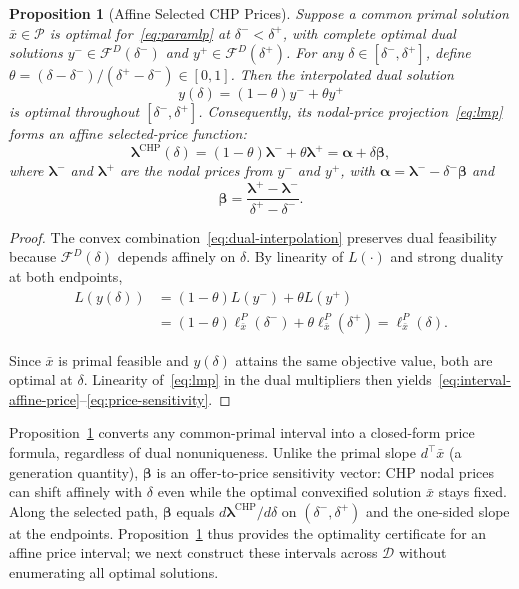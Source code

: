 \documentclass[journal]{IEEEtran}
\newtheorem{proposition}{Proposition}
\newcommand{\blambda}{\bm\lambda}
\newcommand{\CHP}{\mathrm{CHP}}
\begin{document}
\begin{proposition}[Affine Selected CHP Prices]
\label{prop:dual}
Suppose a common primal solution $\bar{x}\!\!\in\!\!\mathcal{P}$ is optimal for~\eqref{eq:paramlp} at $\delta^-\!\!<\!\!\delta^+$, with complete optimal dual solutions $y^-\!\!\in\!\!\mathcal{F}^D(\delta^-)$ and $y^+\!\!\in\!\!\mathcal{F}^D(\delta^+)$. For any $\delta\!\in\![\delta^-,\delta^+]$, define $\theta\!\!=\!\!(\delta\!-\!\delta^-)\!/\!(\delta^+\!-\!\delta^-)\!\in\![0,1]$. Then the interpolated dual solution
\begin{equation}
y(\delta) = (1-\theta)y^- + \theta y^+\label{eq:dual-interpolation}
\end{equation}
is optimal throughout $[\delta^-,\delta^+]$. Consequently, its nodal-price projection~\eqref{eq:lmp} forms an affine selected-price function:
\begin{equation}
\blambda^{\CHP}(\delta) = (1-\theta)\blambda^- + \theta\blambda^+ = \bm{\alpha} + \delta\bm{\beta},\label{eq:interval-affine-price}
\end{equation}
where $\blambda^-$ and $\blambda^+$ are the nodal prices from $y^-$ and $y^+$, with $\bm{\alpha}=\blambda^--\delta^-\bm{\beta}$ and
\begin{equation}
\bm{\beta} = \frac{\blambda^+ - \blambda^-}{\delta^+ - \delta^-}.\label{eq:price-sensitivity}
\end{equation}
\end{proposition}

\begin{proof}
The convex combination~\eqref{eq:dual-interpolation} preserves dual feasibility because $\mathcal{F}^D(\delta)$ depends affinely on $\delta$. By linearity of $L(\cdot)$ and strong duality at both endpoints,
\begin{align*}
L(y(\delta)) &= (1-\theta)L(y^-) + \theta L(y^+)\\
&= (1-\theta)\ell_{\bar{x}}^P(\delta^-) + \theta\ell_{\bar{x}}^P(\delta^+) = \ell_{\bar{x}}^P(\delta).
\end{align*}

Since $\bar{x}$ is primal feasible and $y(\delta)$ attains the same objective value, both are optimal at $\delta$. Linearity of~\eqref{eq:lmp} in the dual multipliers then yields~\eqref{eq:interval-affine-price}--\eqref{eq:price-sensitivity}.
\end{proof}

Proposition~\ref{prop:dual} converts any common-primal interval into a closed-form price formula, regardless of dual nonuniqueness. Unlike the primal slope $d^\top\bar{x}$ (a generation quantity), $\bm{\beta}$ is an offer-to-price sensitivity vector: CHP nodal prices can shift affinely with $\delta$ even while the optimal convexified solution $\bar{x}$ stays fixed. Along the selected path, $\bm{\beta}$ equals $d\blambda^{\CHP}/d\delta$ on $(\delta^-,\delta^+)$ and the one-sided slope at the endpoints. Proposition~\ref{prop:dual} thus provides the optimality certificate for an affine price interval; we next construct these intervals across $\mathcal{D}$ without enumerating all optimal solutions.
\end{document}
